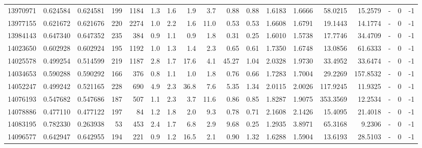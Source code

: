 \begin{tabular}{rrrrrrrrrrrrrrrlrr}
  13970971 & 0.624584 &   0.624581 &  199 & 1184 &      1.3 &      1.6 &     1.9 &      3.7 &       0.88 &        0.88 &  1.6183 &  1.6666 &   58.0215 &   15.2579 &             - &        0 &         -1 \\
  13977155 & 0.621672 &   0.621676 &  220 & 2274 &      1.0 &      2.2 &     1.6 &     11.0 &       0.53 &        0.53 &  1.6608 &  1.6791 &   19.1443 &   14.1774 &             - &        0 &         -1 \\
  13984143 & 0.647340 &   0.647352 &  235 &  384 &      0.9 &      1.1 &     0.9 &      1.8 &       0.31 &        0.25 &  1.6010 &  1.5738 &   17.7746 &   34.4709 &             - &        0 &         -1 \\
  14023650 & 0.602928 &   0.602924 &  195 & 1192 &      1.0 &      1.3 &     1.4 &      2.3 &       0.65 &        0.61 &  1.7350 &  1.6748 &   13.0856 &   61.6333 &             - &        0 &         -1 \\
  14025578 & 0.499254 &   0.514599 &  219 & 1187 &      2.8 &      1.7 &    17.6 &      4.1 &      45.27 &        1.04 &  2.0328 &  1.9730 &   33.4952 &   33.6474 &             - &        0 &         -1 \\
  14034653 & 0.590288 &   0.590292 &  166 &  376 &      0.8 &      1.1 &     1.0 &      1.8 &       0.76 &        0.66 &  1.7283 &  1.7004 &   29.2269 &  157.8532 &             - &        0 &         -1 \\
  14052247 & 0.499242 &   0.521165 &  228 &  690 &      4.9 &      2.3 &    36.8 &      7.6 &       5.35 &        1.34 &  2.0115 &  2.0026 &  117.9245 &   11.9325 &             - &        0 &         -1 \\
  14076193 & 0.547682 &   0.547686 &  187 &  507 &      1.1 &      2.3 &     3.7 &     11.6 &       0.86 &        0.85 &  1.8287 &  1.9075 &  353.3569 &   12.2534 &             - &        0 &         -1 \\
  14078886 & 0.477110 &   0.477122 &  197 &   84 &      1.2 &      1.8 &     2.0 &      9.3 &       0.78 &        0.71 &  2.1608 &  2.1426 &   15.4095 &   21.4018 &             - &        0 &         -1 \\
  14083195 & 0.782330 &   0.263938 &   53 &  453 &      2.4 &      1.7 &     6.8 &      2.9 &       9.68 &        0.25 &  1.2935 &  3.8971 &   65.3168 &    9.2306 &             - &        0 &         -1 \\
  14096577 & 0.642947 &   0.642955 &  194 &  221 &      0.9 &      1.2 &    16.5 &      2.1 &       0.90 &        1.32 &  1.6288 &  1.5904 &   13.6193 &   28.5103 &             - &        0 &         -1 \\

\end{tabular}
